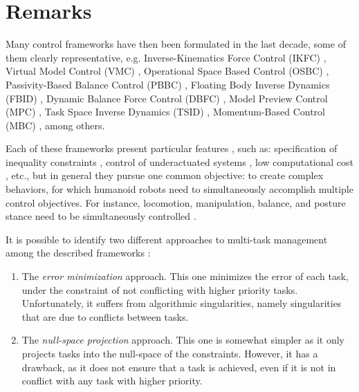 \section{Remarks}
	\label{sec:remarks}
	
	Many control frameworks have then been formulated in the last decade, some of them clearly
	representative, e.g. Inverse-Kinematics Force Control (IKFC) \cite{Fujimoto_ICRA1996},
	Virtual Model Control (VMC) \cite{Pratt_IJRR2001}, Operational Space Based Control
	(OSBC) \cite{Sentis_MotionPlan2010}, Passivity-Based Balance Control (PBBC)
	\cite{Hyon_TransRobotics2007}, Floating Body Inverse Dynamics (FBID) \cite{Mistry_ICRA2010},
	Dynamic Balance Force Control (DBFC) \cite{Stephens_IROS2010}, Model Preview Control (MPC)
	\cite{Nagasaka_RobotSymp2012}, Task Space Inverse Dynamics (TSID) \cite{DelPrete_PhDThesis2013},
	Momentum-Based Control (MBC) \cite{Hopkins_IJHR2016}, among others.
	
	Each of these frameworks present particular features \cite{DelPrete_PhDThesis2013}, such as:
	specification of inequality constraints \cite{Mansard_TransRobotics2009} \cite{Saab_ICRA2011},
	control of underactuated systems \cite{DeLasa_IROS2009} \cite{Mistry_RSS2011}, low computational
	cost \cite{Escande_ICRA2010} \cite{Mansard_ICRA2012}, etc., but in general they pursue one
	common objective: to create complex behaviors, for which humanoid robots need to simultaneously
	accomplish multiple control objectives.
	For instance, locomotion, manipulation, balance, and posture stance need to be simultaneously
	controlled \cite{Sentis_PhDThesis2007}.
	
	It is possible to identify two different approaches to multi-task management among the described
	frameworks \cite{DelPrete_PhDThesis2013}:
	\begin{enumerate}
		\item The \emph{error minimization} approach.
					This one minimizes the error of each task, under the constraint of not conflicting
					with higher priority tasks.
					Unfortunately, it suffers from algorithmic singularities, namely singularities that
					are due to conflicts between tasks.
					
		\item The \emph{null-space projection} approach.
					This one is somewhat simpler as it only projects tasks into the null-space of the
					constraints.
					However, it has a drawback, as it does not ensure that a	task is achieved,
					even if it is not in conflict with any task with higher priority.
		
	\end{enumerate}
		
